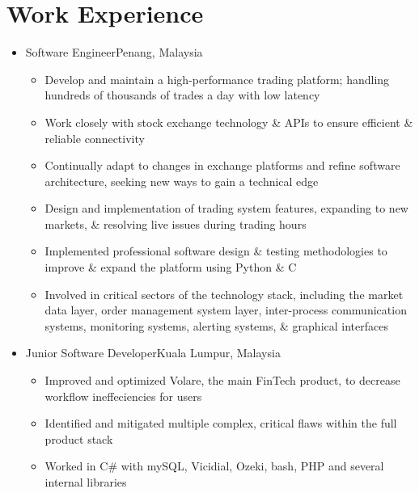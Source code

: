 \documentclass[10pt,letterpaper,sans]{moderncv}
\renewcommand{\_}{\textscale{.7}{\textunderscore}}
\newcommand{\Rplus}{\protect\hspace{-.1em}\protect\raisebox{.35ex}{\smaller{\smaller\textbf{+}}}}
\newcommand{\Cpp}{\mbox{C\Rplus\Rplus}\xspace}
\begin{document}
\section{Work Experience}
\vspace{0.75em}
\begin{itemize}
  \item{
  {Software Engineer}{Penang, Malaysia}{}{
    \begin{itemize}
      \item Develop and maintain a high-performance trading platform; handling hundreds of thousands of trades a day with low latency
      \item Work closely with stock exchange technology \& APIs to ensure efficient \& reliable connectivity
      \item Continually adapt to changes in exchange platforms and refine software architecture, seeking new ways to gain a technical edge
      \item Design and implementation of trading system features, expanding to new markets, \& resolving live issues during trading hours
      \item Implemented professional software design \& testing methodologies to improve \& expand the platform using Python \& \Cpp
      \item Involved in critical sectors of the technology stack, including the market data layer, order management system layer, inter-process communication systems, monitoring systems, alerting systems, \& graphical interfaces
  \end{itemize}
}}
\vspace{0.75em}
\item{
  {Junior Software Developer}{Kuala Lumpur, Malaysia}{}{
    \begin{itemize}
    \item Improved and optimized Volare, the main FinTech product, to decrease workflow ineffeciencies for users
    \item Identified and mitigated multiple complex, critical flaws within the full product stack
    \item Worked in C\# with mySQL, Vicidial, Ozeki, bash, PHP and several internal libraries
    \end{itemize}
}}
\end{itemize}
\end{document}
